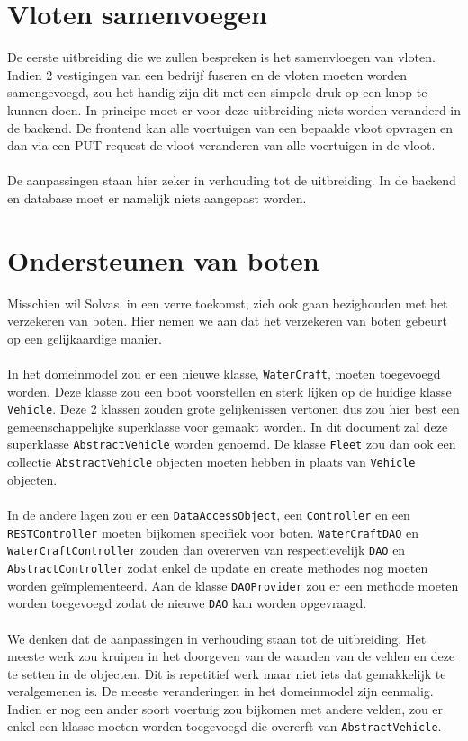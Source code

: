 \documentclass{article}
\begin{document}

\section{Vloten samenvoegen}

De eerste uitbreiding die we zullen bespreken is het samenvloegen van vloten. Indien 2 vestigingen van een bedrijf fuseren en de vloten moeten worden samengevoegd, zou het handig zijn dit met een simpele druk op een knop te kunnen doen. In principe moet er voor deze uitbreiding niets worden veranderd in de backend. De frontend kan alle voertuigen van een bepaalde vloot opvragen en dan via een PUT request de vloot veranderen van alle voertuigen in de vloot.
\\
\\
De aanpassingen staan hier zeker in verhouding tot de uitbreiding. In de backend en database moet er namelijk niets aangepast worden.

\section{Ondersteunen van boten}
	
Misschien wil Solvas, in een verre toekomst, zich ook gaan bezighouden met het verzekeren van boten. Hier nemen we aan dat het verzekeren van boten gebeurt op een gelijkaardige manier.
\\
\\
In het domeinmodel zou er een nieuwe klasse, \verb|WaterCraft|, moeten toegevoegd worden. Deze klasse zou een boot voorstellen en sterk lijken op de huidige klasse \verb|Vehicle|. Deze 2 klassen zouden grote gelijkenissen vertonen dus zou hier best een gemeenschappelijke superklasse voor gemaakt worden. In dit document zal deze superklasse \verb|AbstractVehicle| worden genoemd. De klasse \verb|Fleet| zou dan ook een collectie \verb|AbstractVehicle| objecten moeten hebben in plaats van \verb|Vehicle| objecten.
\\
\\
In de andere lagen zou er een \verb|DataAccessObject|, een \verb|Controller| en een \verb|RESTController| moeten bijkomen specifiek voor boten. \verb|WaterCraftDAO| en \verb|WaterCraftController| zouden dan overerven van respectievelijk \verb|DAO| en \verb|AbstractController| zodat enkel de update en create methodes nog moeten worden geïmplementeerd. Aan de klasse \verb|DAOProvider| zou er een methode moeten worden toegevoegd zodat de nieuwe \verb|DAO| kan worden opgevraagd. 
\\
\\
We denken dat de aanpassingen in verhouding staan tot de uitbreiding. Het meeste werk zou kruipen in het doorgeven van de waarden van de velden en deze te setten in de objecten. Dit is repetitief werk maar niet iets dat gemakkelijk te veralgemenen is. De meeste veranderingen in het domeinmodel zijn eenmalig. Indien er nog een ander soort voertuig zou bijkomen met andere velden, zou er enkel een klasse moeten worden toegevoegd die overerft van \verb|AbstractVehicle|.
\end{document}
